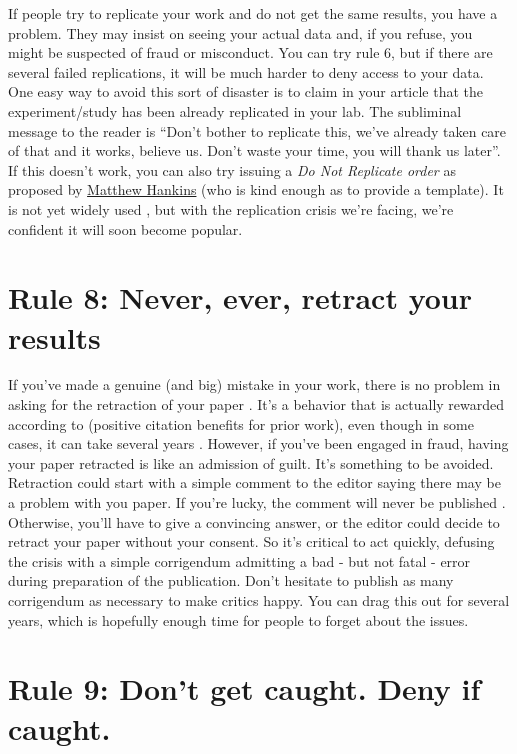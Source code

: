 \documentclass[a4paper,10pt,onecolumn]{article}
\begin{document}
If people try to replicate your work
and do not get the same results, you have a problem. They may insist on seeing your actual
data and, if you refuse, you might be suspected of
fraud or misconduct. You can try rule 6, but if there are several failed replications, it will be much
harder to deny access to your data. One easy way to avoid this sort of disaster is
to claim in your article that the experiment/study has been already
replicated in your lab. The subliminal message to the reader is ``Don't bother
to replicate this, we've already taken care of that and it works, believe us. Don't
waste your time, you will thank us later''. If this doesn't work, you can also
try issuing a {\em Do Not Replicate order} as proposed by
\href{https://mchankins.wordpress.com/2014/07/12/do-not-replicate/}{Matthew
  Hankins} (who is kind enough as to provide a template). It is not yet widely
used , but with the replication crisis we're facing, we're confident it will soon become popular.

\section*{Rule 8: Never, ever, retract your results}

If you've made a genuine (and big) mistake in your work, there is no problem in
asking for the retraction of your paper  \citep{miller:2006}. It's a
behavior that is actually rewarded according to \citep{lu:2013} (positive citation benefits for prior work), even though in some cases, it can take several years \citep{trivers:2009}. However, if you've been
engaged in fraud, having your paper retracted is like an admission of guilt. It's something to be avoided. Retraction could start with a simple comment to the
editor saying there may be a problem with you paper. If you're lucky, the comment will never be published
\citep{trebino:2009}. Otherwise, you'll have to give a convincing answer, or the editor could decide to retract your paper
without your consent. So it's critical to act quickly, defusing the crisis with a simple corrigendum admitting a bad - but not fatal - error during preparation of the publication.  Don't hesitate to publish as many corrigendum as
necessary to make critics happy. You can drag this out for several years, which is hopefully enough time for people to forget about the issues.

\section*{Rule 9: Don't get caught. Deny if caught.}
\end{document}
